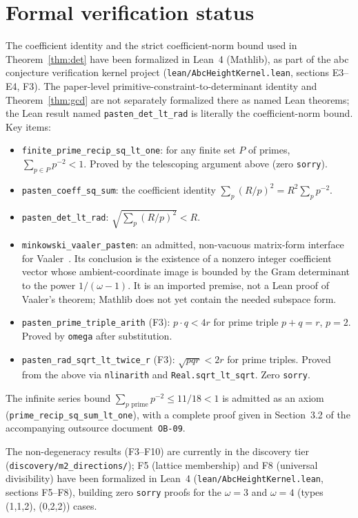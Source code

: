 \documentclass[12pt]{article}
\theoremstyle{definition}
\begin{document}
\section{Formal verification status}
\begingroup\raggedright

The coefficient identity and the strict coefficient-norm bound used in
Theorem~\ref{thm:det} have been formalized in Lean~4 (Mathlib), as part of the
abc conjecture verification kernel project
(\texttt{lean/AbcHeightKernel.lean}, sections E3--E4, F3).  The paper-level
primitive-constraint-to-determinant identity and Theorem~\ref{thm:gcd} are not
separately formalized there as named Lean theorems; the Lean result named
\texttt{pasten\_det\_lt\_rad} is literally the coefficient-norm bound.
Key items:
\begin{itemize}
  \item \texttt{finite\_prime\_recip\_sq\_lt\_one}: for any finite set $P$ of
    primes, $\sum_{p \in P} p^{-2} < 1$.  Proved by the telescoping argument
    above (zero \texttt{sorry}).
  \item \texttt{pasten\_coeff\_sq\_sum}: the coefficient identity
    $\sum_p (R/p)^2 = R^2 \sum_p p^{-2}$.
  \item \texttt{pasten\_det\_lt\_rad}: $\sqrt{\sum_p (R/p)^2} < R$.
  \item \texttt{minkowski\_vaaler\_pasten}: an admitted, non-vacuous
    matrix-form interface for Vaaler~\cite{Vaaler1979}.  Its conclusion is the
    existence of a nonzero integer coefficient vector whose ambient-coordinate
    image is bounded by the Gram determinant to the power
    $1/(\omega-1)$.  It is an imported premise, not a Lean proof of Vaaler's
    theorem; Mathlib does not yet contain the needed subspace form.
  \item \texttt{pasten\_prime\_triple\_arith} (F3): $p \cdot q < 4r$ for
    prime triple $p+q=r$, $p=2$.  Proved by \texttt{omega} after substitution.
  \item \texttt{pasten\_rad\_sqrt\_lt\_twice\_r} (F3): $\sqrt{pqr} < 2r$ for
    prime triples.  Proved from the above via \texttt{nlinarith} and
    \texttt{Real.sqrt\_lt\_sqrt}.  Zero \texttt{sorry}.
\end{itemize}

The infinite series bound $\sum_{p \text{ prime}} p^{-2} \le 11/18 < 1$
is admitted as an axiom (\texttt{prime\_recip\_sq\_sum\_lt\_one}), with a
complete proof given in Section~3.2 of the accompanying outsource
document~\texttt{OB-09}.

The non-degeneracy results (F3--F10) are currently in the discovery tier
(\texttt{discovery/m2\_directions/}); F5 (lattice membership) and F8 (universal
divisibility) have been formalized in Lean~4 (\texttt{lean/AbcHeightKernel.lean},
sections F5--F8), building zero \texttt{sorry} proofs for the $\omega = 3$ and
$\omega = 4$ (types (1,1,2), (0,2,2)) cases.
\end{document}
